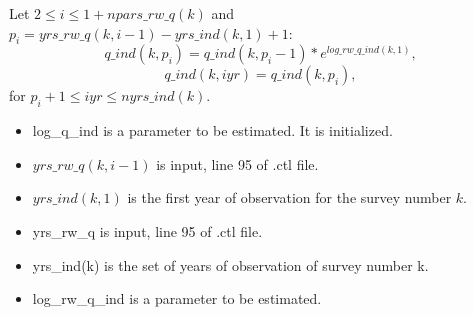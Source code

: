 \documentclass{article}
\begin{document}
Let $2\leq i \leq 1+npars\_rw\_q(k)$ and $p_i=yrs\_rw\_q(k,i-1)-yrs\_ind(k,1)+1$:
\begin{equation}
     q\_ind(k,p_i)  = q\_ind(k,p_i-1)*e^{log\_rw\_q\_ind(k,1)},
\end{equation}
\begin{equation}
    q\_ind(k,iyr)  = q\_ind(k,p_i), 
\end{equation}
for $p_i+1\leq iyr \leq nyrs\_ind(k).$
\begin{itemize}
    \item log\_q\_ind is a parameter to be estimated. It is initialized.
    \item $yrs\_rw\_q(k,i-1)$ is input, line 95 of .ctl file.
    \item $yrs\_ind(k,1)$ is the first year of observation for the survey number $k$.
    \item yrs\_rw\_q is input, line 95 of .ctl file.
    \item yrs\_ind(k) is the set of years of observation of survey number k. 
    \item log\_rw\_q\_ind is a parameter to be estimated.
\end{itemize}
\end{document}
